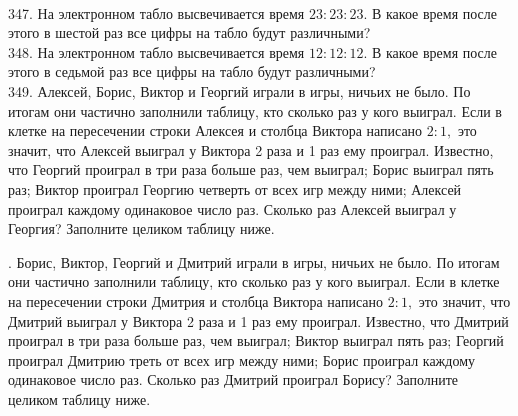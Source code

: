 \documentclass[12pt]{article}
\begin{document}
\begin{figure}[ht!]
\end{figure}\\
347. На электронном табло высвечивается время $23:23:23.$ В какое время после этого в шестой раз все цифры на табло будут различными?\\
348. На электронном табло высвечивается время $12:12:12.$ В какое время после этого в седьмой раз все цифры на табло будут различными?\\
349. Алексей, Борис, Виктор и Георгий играли в игры, ничьих не было. По итогам они частично заполнили таблицу, кто сколько раз у кого выиграл. Если в клетке на пересечении строки Алексея и столбца Виктора написано $2:1,$ это значит, что Алексей выиграл у Виктора 2 раза и 1 раз ему проиграл. Известно, что Георгий проиграл в три раза больше раз, чем выиграл; Борис выиграл пять раз; Виктор проиграл Георгию четверть от всех игр между ними; Алексей проиграл каждому одинаковое число раз. Сколько раз Алексей выиграл у Георгия? Заполните целиком таблицу ниже.\\
\begin{figure}[ht!]
\end{figure}\newpage{}. Борис, Виктор, Георгий и Дмитрий играли в игры, ничьих не было. По итогам они частично заполнили таблицу, кто сколько раз у кого выиграл. Если в клетке на пересечении строки Дмитрия и столбца Виктора написано $2:1,$ это значит, что Дмитрий выиграл у Виктора 2 раза и 1 раз ему проиграл. Известно, что Дмитрий проиграл в три раза больше раз, чем выиграл; Виктор выиграл пять раз; Георгий проиграл Дмитрию треть от всех игр между ними; Борис проиграл каждому одинаковое число раз. Сколько раз Дмитрий проиграл Борису? Заполните целиком таблицу ниже.\\
\end{document}
